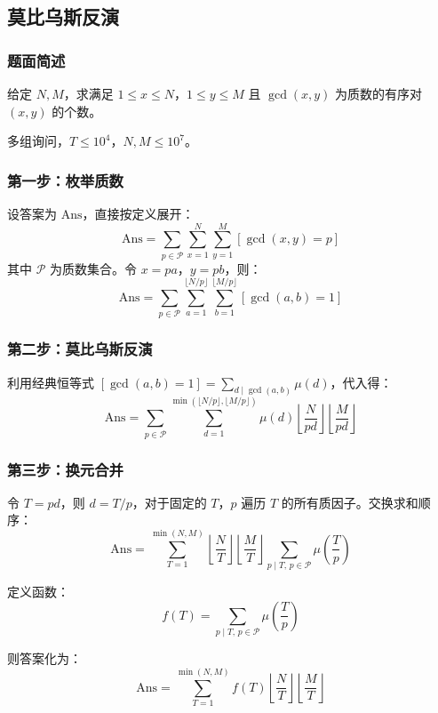 \documentclass[11pt,a4paper,twocolumn]{ctexart}  %
\begin{document}
\subsection{莫比乌斯反演}
\subsubsection*{题面简述}

给定 $N, M$，求满足 $1 \le x \le N$，$1 \le y \le M$ 且 $\gcd(x, y)$ 为质数的有序对 $(x, y)$ 的个数。

多组询问，$T \le 10^4$，$N, M \le 10^7$。


\subsubsection*{第一步：枚举质数}

设答案为 $\mathrm{Ans}$，直接按定义展开：
\[
    \mathrm{Ans} = \sum_{p \in \mathcal{P}} \sum_{x=1}^{N} \sum_{y=1}^{M} [\gcd(x, y) = p]
\]
其中 $\mathcal{P}$ 为质数集合。令 $x = pa$，$y = pb$，则：
\[
    \mathrm{Ans} = \sum_{p \in \mathcal{P}} \sum_{a=1}^{\lfloor N/p \rfloor} \sum_{b=1}^{\lfloor M/p \rfloor} [\gcd(a, b) = 1]
\]

\subsubsection*{第二步：莫比乌斯反演}

利用经典恒等式 $[\gcd(a,b)=1] = \sum_{d \mid \gcd(a,b)} \mu(d)$，代入得：
\[
    \mathrm{Ans} = \sum_{p \in \mathcal{P}} \sum_{d=1}^{\min(\lfloor N/p \rfloor, \lfloor M/p \rfloor)} \mu(d) \left\lfloor \frac{N}{pd} \right\rfloor \left\lfloor \frac{M}{pd} \right\rfloor
\]

\subsubsection*{第三步：换元合并}

令 $T = pd$，则 $d = T/p$，对于固定的 $T$，$p$ 遍历 $T$ 的所有质因子。交换求和顺序：
\[
    \mathrm{Ans} = \sum_{T=1}^{\min(N,M)} \left\lfloor \frac{N}{T} \right\rfloor \left\lfloor \frac{M}{T} \right\rfloor \sum_{p \mid T,\, p \in \mathcal{P}} \mu\!\left(\frac{T}{p}\right)
\]

定义函数：
\[
    f(T) = \sum_{p \mid T,\, p \in \mathcal{P}} \mu\!\left(\frac{T}{p}\right)
\]

则答案化为：
\[
    \mathrm{Ans} = \sum_{T=1}^{\min(N,M)} f(T) \left\lfloor \frac{N}{T} \right\rfloor \left\lfloor \frac{M}{T} \right\rfloor
\]
\end{document}
